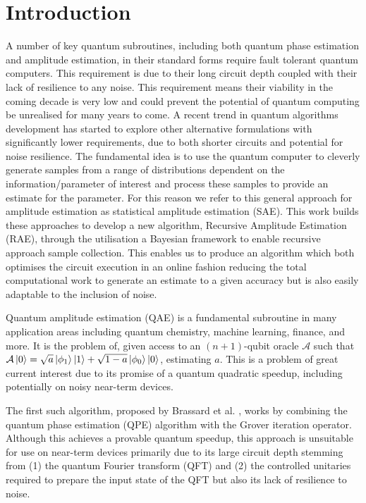 
\section{Introduction}
A number of key quantum subroutines, including both quantum phase estimation and amplitude estimation, in their standard forms  \cite{qpe,ae} require fault tolerant quantum computers. This requirement is due to their long circuit depth coupled with their lack of resilience to any noise. This requirement means their viability in the coming decade is very low and could prevent the potential of quantum computing be unrealised for many years to come. A recent trend in quantum algorithms development has started to explore other alternative formulations \cite{suzuki_2020_amp_without_phase,smith_2023_adaptive_bayesian_qae} with significantly lower requirements, due to both shorter circuits and potential for noise resilience. The fundamental idea is to use the quantum computer to cleverly generate samples from a range of distributions dependent on the information/parameter of interest and process these samples to provide an estimate for the parameter. For this reason we refer to this general approach for amplitude estimation as statistical amplitude estimation (SAE). This work builds these approaches to develop a new algorithm, Recursive Amplitude Estimation (RAE), through the utilisation a Bayesian framework to enable recursive approach sample collection. This enables us to produce an algorithm which both optimises the circuit execution in an online fashion reducing the total computational work to generate an estimate to a given accuracy but is also easily adaptable to the inclusion of noise.



Quantum amplitude estimation (QAE) is a fundamental subroutine in many application areas including quantum chemistry, machine learning, finance, and more. It is the problem of,\textbf{} given access to an $(n+1)$-qubit oracle $\mathcal{A}$ such that $\mathcal{A} \ket{0} = \sqrt{a} \ket{\phi_1} \ket{1} + \sqrt{1-a} \ket{\phi_0} \ket{0}$, estimating $a$. This is a problem of great current interest due to its promise of a quantum quadratic speedup, including potentially on noisy near-term devices.


The first such algorithm, proposed by Brassard et al. \cite{brassard_2002_q_amp_amp}, works by combining the quantum phase estimation (QPE) algorithm \cite{kitaev_1995_mmts_abelian_stab} with the Grover iteration operator. Although this achieves a provable quantum speedup, this approach is unsuitable for use on near-term devices primarily due to its large circuit depth stemming from (1) the quantum Fourier transform (QFT) \cite{coppersmith_2002_approximate_ft_for_q_factoring} and (2) the controlled unitaries required to prepare the input state of the QFT but also its lack of resilience to noise.

